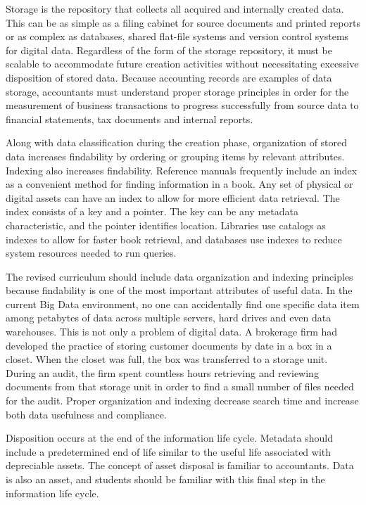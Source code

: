 \documentclass[12pt]{article}
\begin{document}
Storage is the repository that collects all acquired and internally created data. This can be as simple as a filing cabinet for source documents and printed reports or as complex as databases, shared flat-file systems and version control systems for digital data. Regardless of the form of the storage repository, it must be scalable to accommodate future creation activities without necessitating excessive disposition of stored data. Because accounting records are examples of data storage, accountants must understand proper storage principles in order for the measurement of business transactions to progress successfully from source data to financial statements, tax documents and internal reports.

Along with data classification during the creation phase, organization of stored data increases findability by ordering or grouping items by relevant attributes. Indexing also increases findability. Reference manuals frequently include an index as a convenient method for finding information in a book. Any set of physical or digital assets can have an index to allow for more efficient data retrieval. The index consists of a key and a pointer. The key can be any metadata characteristic, and the pointer identifies location. Libraries use catalogs as indexes to allow for faster book retrieval, and databases use indexes to reduce system resources needed to run queries.

The revised curriculum should include data organization and indexing principles because findability is one of the most important attributes of useful data. In the current Big Data environment, no one can accidentally find one specific data item among petabytes of data across multiple servers, hard drives and even data warehouses. This is not only a problem of digital data. A brokerage firm had developed the practice of storing customer documents by date in a box in a closet. When the closet was full, the box was transferred to a storage unit. During an audit, the firm spent countless hours retrieving and reviewing documents from that storage unit in order to find a small number of files needed for the audit. Proper organization and indexing decrease search time and increase both data usefulness and compliance.

Disposition occurs at the end of the information life cycle. Metadata should include a predetermined end of life similar to the useful life associated with depreciable assets. The concept of asset disposal is familiar to accountants. Data is also an asset, and students should be familiar with this final step in the information life cycle.
\end{document}
